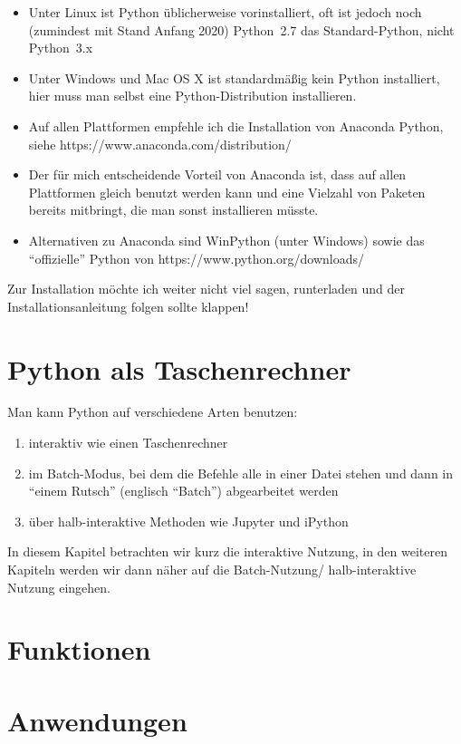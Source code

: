 \documentclass[12pt,ngerman]{scrreprt}
\begin{document}
\begin{itemize}
	\item Unter Linux ist Python üblicherweise vorinstalliert, oft ist jedoch noch (zumindest mit Stand Anfang 2020) Python~2.7 das Standard-Python, nicht Python~3.x 
	\item Unter Windows und Mac OS X ist standardmäßig kein Python installiert, hier muss man selbst eine Python-Distribution installieren.
	\item Auf allen Plattformen empfehle ich die Installation von Anaconda Python, siehe https://www.anaconda.com/distribution/
	\item Der für mich entscheidende Vorteil von Anaconda ist, dass auf allen Plattformen gleich  benutzt werden kann und eine Vielzahl von Paketen bereits mitbringt, die man sonst installieren müsste.
	\item Alternativen zu Anaconda sind WinPython (unter Windows) sowie das \enquote{offizielle} Python von https://www.python.org/downloads/
\end{itemize}

Zur Installation möchte ich weiter nicht viel sagen, runterladen und der Installationsanleitung folgen sollte klappen!


\chapter{Python als Taschenrechner}

Man kann Python auf verschiedene Arten benutzen:

\begin{enumerate}
\item interaktiv wie einen Taschenrechner
\item im Batch-Modus, bei dem die Befehle alle in einer Datei stehen und dann in \enquote{einem Rutsch} (englisch \enquote{Batch}) abgearbeitet werden
\item über halb-interaktive Methoden wie Jupyter und iPython
\end{enumerate}

In diesem Kapitel betrachten wir kurz die interaktive Nutzung, in den weiteren Kapiteln werden wir dann näher auf die Batch-Nutzung/ halb-interaktive Nutzung eingehen.

\chapter{Funktionen}

\chapter{Anwendungen}
\end{document}
